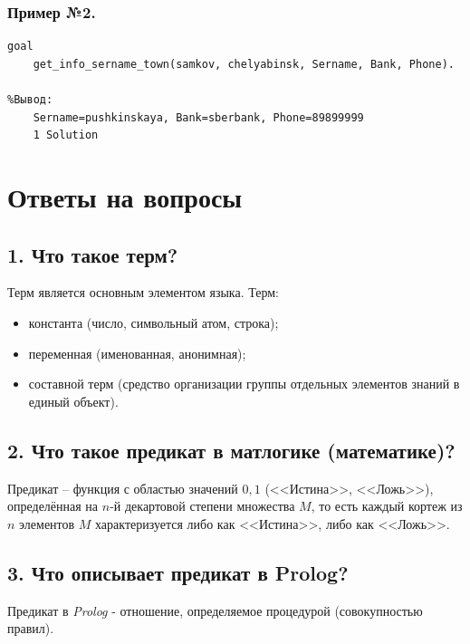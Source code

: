 \documentclass[a4paper,12pt]{article}
\begin{document}
\newpage
	
	\subsubsection*{Пример №2.}
	
	\begin{verbatim}
goal
	get_info_sername_town(samkov, chelyabinsk, Sername, Bank, Phone).
	
%Вывод:
	Sername=pushkinskaya, Bank=sberbank, Phone=89899999
	1 Solution
	\end{verbatim}
	
	\newpage
	
	\section*{Ответы на вопросы}
	
	\subsection*{1.	Что такое терм?}
	
	Терм является основным элементом языка. Терм:
	
	\begin{itemize}
		\item константа (число, символьный атом, строка);
		\item переменная (именованная, анонимная);
		\item составной терм (средство организации группы отдельных элементов знаний в единый объект).
	\end{itemize}
	
	\subsection*{2.	Что такое предикат в матлогике (математике)?}
	
	Предикат – функция с областью значений ${0,1}$ ({<<Истина>>, <<Ложь>>}), определённая на $n$-й декартовой степени множества $M$,
	то есть каждый кортеж из $n$ элементов $M$ характеризуется либо как <<Истина>>, либо как <<Ложь>>.
	
	\subsection*{3.	Что описывает предикат в Prolog?}
	
	Предикат в \textit{Prolog} - отношение, определяемое процедурой (совокупностью правил).
	
\end{document}
